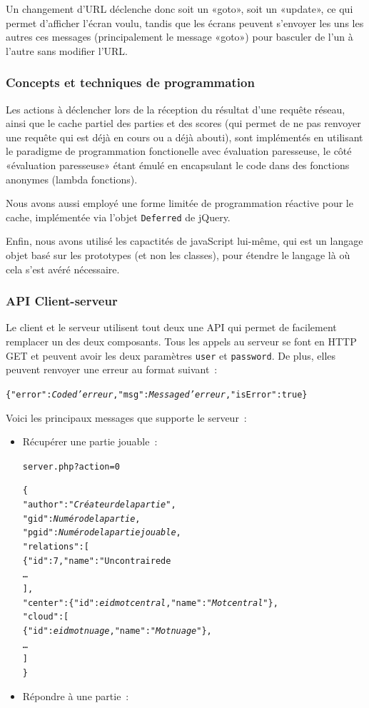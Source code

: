 \documentclass[a4paper,11pt,french]{article}
\begin{document}
{Un changement d'URL déclenche donc soit un «goto», soit un «update», ce qui permet d'afficher l'écran voulu, tandis que les écrans peuvent
s'envoyer les uns les autres ces messages (principalement le message «goto») pour basculer de l'un à l'autre sans modifier l'URL.

\subsubsection{Concepts et techniques de programmation}

Les actions à déclencher lors de la réception du résultat d'une requête réseau, ainsi que le cache partiel des parties et des scores (qui
permet de ne pas renvoyer une requête qui est déjà en cours ou a déjà abouti), sont implémentés en utilisant le paradigme de programmation
fonctionelle avec évaluation paresseuse, le côté «évaluation paresseuse» étant émulé en encapsulant le code dans des fonctions anonymes
(lambda fonctions).

Nous avons aussi employé une forme limitée de programmation réactive pour le cache, implémentée via l'objet \verb!Deferred! de jQuery.

Enfin, nous avons utilisé les capactités de javaScript lui-même, qui est un langage objet basé sur les prototypes (et non les classes), pour
étendre le langage là où cela s'est avéré nécessaire.

\subsubsection{API Client-serveur}
Le client et le serveur utilisent tout deux une API qui permet de facilement remplacer un des deux composants. Tous les appels au serveur se font en HTTP GET et peuvent avoir les deux paramètres \verb!user! et \verb!password!. De plus, elles peuvent renvoyer une erreur au format suivant~:
\begin{alltt}
\{"error":\textit{Code d'erreur}, "msg":\textit{Message d'erreur}, "isError":true\}
\end{alltt}

Voici les principaux messages que supporte le serveur~:
\begin{itemize}
\item Récupérer une partie jouable~:

\verb!server.php?action=0!
{
\small
\begin{alltt}
\{
\quad"author":"\textit{Créateur de la partie}",
\quad"gid":\textit{Numéro de la partie},
\quad"pgid":\textit{Numéro de la partie jouable},
\quad"relations":[
\quad\quad\{"id":7,"name":"Un contraire de %
\quad\quad…
\quad],
\quad"center":\{"id":\textit{eid mot central},"name":"\textit{Mot central}"\},
\quad"cloud":[
\quad\quad\{"id":\textit{eid mot nuage},"name":"\textit{Mot nuage}"\},
\quad\quad…
\quad]
\}
\end{alltt}
}
\item Répondre à une partie~:


\end{itemize}}
\end{document}
